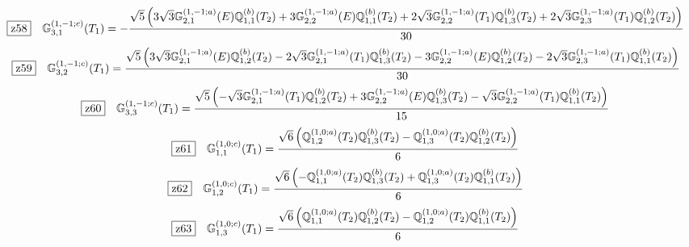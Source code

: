 \documentclass[fleqn,10pt,landscape]{jsarticle}
\begin{document}
\begin{dmath*}
\hspace*{3mm}\fbox{z58}\quad \mathbb{G}_{3,1}^{(1,-1;c)}(T_{1})=- \frac{\sqrt{5} \left(3 \sqrt{3} \mathbb{G}_{2,1}^{(1,-1;a)}(E) \mathbb{Q}_{1,1}^{(b)}(T_{2}) + 3 \mathbb{G}_{2,2}^{(1,-1;a)}(E) \mathbb{Q}_{1,1}^{(b)}(T_{2}) + 2 \sqrt{3} \mathbb{G}_{2,2}^{(1,-1;a)}(T_{1}) \mathbb{Q}_{1,3}^{(b)}(T_{2}) + 2 \sqrt{3} \mathbb{G}_{2,3}^{(1,-1;a)}(T_{1}) \mathbb{Q}_{1,2}^{(b)}(T_{2})\right)}{30}
\end{dmath*}
\begin{dmath*}
\hspace*{3mm}\fbox{z59}\quad \mathbb{G}_{3,2}^{(1,-1;c)}(T_{1})=\frac{\sqrt{5} \left(3 \sqrt{3} \mathbb{G}_{2,1}^{(1,-1;a)}(E) \mathbb{Q}_{1,2}^{(b)}(T_{2}) - 2 \sqrt{3} \mathbb{G}_{2,1}^{(1,-1;a)}(T_{1}) \mathbb{Q}_{1,3}^{(b)}(T_{2}) - 3 \mathbb{G}_{2,2}^{(1,-1;a)}(E) \mathbb{Q}_{1,2}^{(b)}(T_{2}) - 2 \sqrt{3} \mathbb{G}_{2,3}^{(1,-1;a)}(T_{1}) \mathbb{Q}_{1,1}^{(b)}(T_{2})\right)}{30}
\end{dmath*}
\begin{dmath*}
\hspace*{3mm}\fbox{z60}\quad \mathbb{G}_{3,3}^{(1,-1;c)}(T_{1})=\frac{\sqrt{5} \left(- \sqrt{3} \mathbb{G}_{2,1}^{(1,-1;a)}(T_{1}) \mathbb{Q}_{1,2}^{(b)}(T_{2}) + 3 \mathbb{G}_{2,2}^{(1,-1;a)}(E) \mathbb{Q}_{1,3}^{(b)}(T_{2}) - \sqrt{3} \mathbb{G}_{2,2}^{(1,-1;a)}(T_{1}) \mathbb{Q}_{1,1}^{(b)}(T_{2})\right)}{15}
\end{dmath*}
\begin{dmath*}
\hspace*{3mm}\fbox{z61}\quad \mathbb{G}_{1,1}^{(1,0;c)}(T_{1})=\frac{\sqrt{6} \left(\mathbb{Q}_{1,2}^{(1,0;a)}(T_{2}) \mathbb{Q}_{1,3}^{(b)}(T_{2}) - \mathbb{Q}_{1,3}^{(1,0;a)}(T_{2}) \mathbb{Q}_{1,2}^{(b)}(T_{2})\right)}{6}
\end{dmath*}
\begin{dmath*}
\hspace*{3mm}\fbox{z62}\quad \mathbb{G}_{1,2}^{(1,0;c)}(T_{1})=\frac{\sqrt{6} \left(- \mathbb{Q}_{1,1}^{(1,0;a)}(T_{2}) \mathbb{Q}_{1,3}^{(b)}(T_{2}) + \mathbb{Q}_{1,3}^{(1,0;a)}(T_{2}) \mathbb{Q}_{1,1}^{(b)}(T_{2})\right)}{6}
\end{dmath*}
\begin{dmath*}
\hspace*{3mm}\fbox{z63}\quad \mathbb{G}_{1,3}^{(1,0;c)}(T_{1})=\frac{\sqrt{6} \left(\mathbb{Q}_{1,1}^{(1,0;a)}(T_{2}) \mathbb{Q}_{1,2}^{(b)}(T_{2}) - \mathbb{Q}_{1,2}^{(1,0;a)}(T_{2}) \mathbb{Q}_{1,1}^{(b)}(T_{2})\right)}{6}
\end{dmath*}
\end{document}
